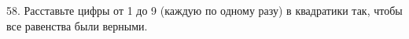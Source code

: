 58. Расставьте цифры от 1 до 9 (каждую по одному разу) в квадратики так, чтобы все равенства были верными.
\begin{center}
\begin{figure}[ht!]
\end{figure}
\end{center}
